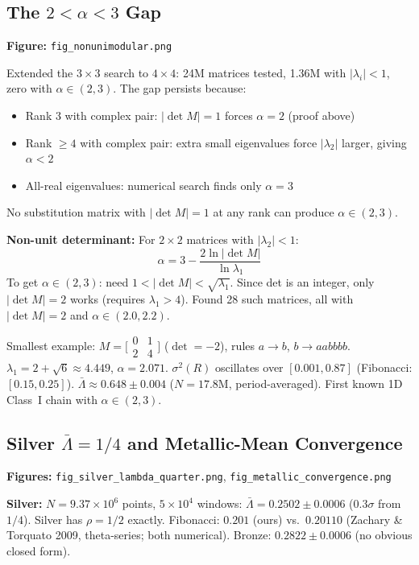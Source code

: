 \documentclass[11pt,letterpaper]{article}
\begin{document}
\subsection{The $2 < \alpha < 3$ Gap}

\textbf{Figure:} \texttt{fig\_nonunimodular.png}

Extended the $3\times3$ search to $4\times4$: 24M matrices tested, 1.36M with
$|\lambda_i| < 1$, zero with $\alpha \in (2,3)$. The gap persists because:
\begin{itemize}[noitemsep]
  \item Rank 3 with complex pair: $|\det M| = 1$ forces $\alpha = 2$ (proof above)
  \item Rank $\geq 4$ with complex pair: extra small eigenvalues force $|\lambda_2|$
        larger, giving $\alpha < 2$
  \item All-real eigenvalues: numerical search finds only $\alpha = 3$
\end{itemize}
No substitution matrix with $|\det M| = 1$ at any rank can produce $\alpha \in (2,3)$.

\textbf{Non-unit determinant:} For $2\times2$ matrices with $|\lambda_2| < 1$:
\[
  \alpha = 3 - \frac{2\ln|\det M|}{\ln\lambda_1}
\]
To get $\alpha \in (2,3)$: need $1 < |\det M| < \sqrt{\lambda_1}$. Since det is an
integer, only $|\det M| = 2$ works (requires $\lambda_1 > 4$). Found 28 such matrices,
all with $|\det M| = 2$ and $\alpha \in (2.0, 2.2)$.

Smallest example: $M = \bigl[\begin{smallmatrix}0&1\\2&4\end{smallmatrix}\bigr]$
($\det = -2$), rules $a \to b$, $b \to aabbbb$.
$\lambda_1 = 2+\sqrt{6} \approx 4.449$, $\alpha = 2.071$.
$\sigma^2(R)$ oscillates over $[0.001, 0.87]$ (Fibonacci: $[0.15, 0.25]$).
$\bar\Lambda \approx 0.648 \pm 0.004$ ($N = 17.8$M, period-averaged).
First known 1D Class~I chain with $\alpha \in (2,3)$.

\subsection{Silver $\bar\Lambda = 1/4$ and Metallic-Mean Convergence}

\textbf{Figures:} \texttt{fig\_silver\_lambda\_quarter.png},
\texttt{fig\_metallic\_convergence.png}

\textbf{Silver:} $N = 9.37 \times 10^6$ points, $5 \times 10^4$ windows:
$\bar\Lambda = 0.2502 \pm 0.0006$ ($0.3\sigma$ from $1/4$).
Silver has $\rho = 1/2$ exactly. Fibonacci: $0.201$ (ours) vs.\ $0.20110$
(Zachary \& Torquato 2009, theta-series; both numerical).
Bronze: $0.2822 \pm 0.0006$ (no obvious closed form).
\end{document}
